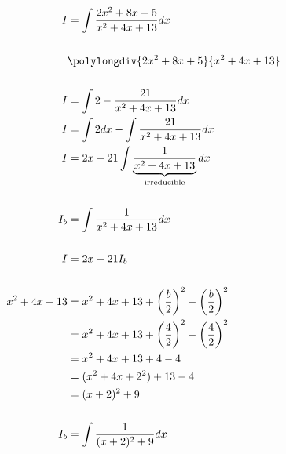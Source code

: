 \documentclass[12pt]{article}
\begin{document}
\begin{align}
    I              & = \int \frac{2x^2+8x+5}{x^2+4x+13} dx                                  \\
    \nonumber                                                                               \\
                   & {\polylongdiv{2x^2+8x+5}{x^2+4x+13}}                                   \\
    \nonumber                                                                               \\
    I              & = \int 2 - \frac{21}{x^2+4x+13} dx                                     \\
    I              & = \int 2 dx - \int \frac{21}{x^2+4x+13} dx                             \\
    I              & = 2x - 21\int \underbrace{\frac{1}{x^2+4x+13}}_\text{irreducible} dx   \\
    \nonumber                                                                               \\
    I_b            & = \int \frac{1}{x^2+4x+13} dx                                          \\
    \nonumber                                                                               \\
    I              & = 2x - 21I_b                                                           \\
    \nonumber                                                                               \\
    x^2+4x+13      & = x^2+4x+13 + \left(\frac{b}{2}\right)^2 - \left(\frac{b}{2}\right)^2  \\
                   & = x^2+4x+13 + \left(\frac{4}{2}\right)^2 - \left(\frac{4}{2}\right)^2  \\
                   & = x^2+4x+13 + 4 - 4                                                    \\
                   & = (x^2 + 4x + 2^2) + 13 - 4                                            \\
                   & = (x + 2)^2 + 9                                                        \\
    \nonumber                                                                               \\
    I_b            & = \int \frac{1}{(x + 2)^2 + 9} dx                                      \\

\end{align}
\end{document}
